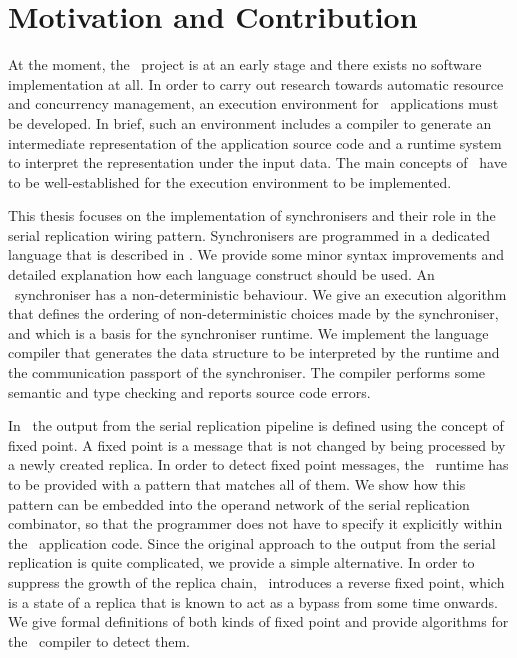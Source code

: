    \section*{Motivation and Contribution}
At the moment, the \ak\ project is at an early stage and there exists no software implementation at all. In order to carry out research towards automatic resource and concurrency management, an execution environment for \ak\ applications must be developed. In brief, such an environment includes a compiler to generate an intermediate representation of the application source code and a runtime system to interpret the representation under the input data. The main concepts of \ak\ have to be well-established for the execution environment to be implemented.

This thesis focuses on the implementation of synchronisers and their role in the serial replication wiring pattern. Synchronisers are programmed in a dedicated language that is described in \cite{astrakahn}. We provide some minor syntax improvements and detailed explanation how each language construct should be used. An \ak\ synchroniser has a non-deterministic behaviour. We give an execution algorithm that defines the ordering of non-deterministic choices made by the synchroniser, and which is a basis for the synchroniser runtime. We implement the language compiler that generates the data structure to be interpreted by the runtime and the communication passport of the synchroniser. The compiler performs some semantic and type checking and reports source code errors.

In \ak\ the output from the serial replication pipeline is defined using the concept of fixed point. A fixed point is a message that is not changed by being processed by a newly created replica. In order to detect fixed point messages, the \ak\ runtime has to be provided with a pattern that matches all of them. We show how this pattern can be embedded into the operand network of the serial replication combinator, so that the programmer does not have to specify it explicitly within the \ak\ application code. Since the original approach to the output from the serial replication is quite complicated, we provide a simple alternative. In order to suppress the growth of the replica chain, \ak\ introduces a reverse fixed point, which is a state of a replica that is known to act as a bypass from some time onwards. We give formal definitions of both kinds of fixed point and provide algorithms for the \ak\ compiler to detect them.


